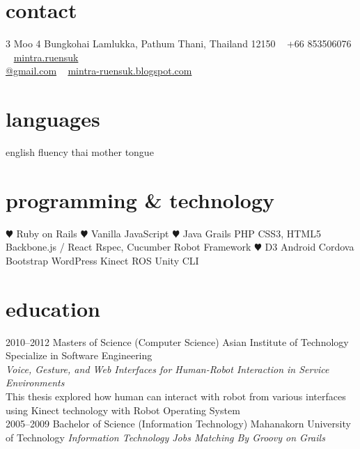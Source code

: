 \documentclass[]{friggeri-cv} %
\begin{document}


\begin{aside} %
\section{contact}
3 Moo 4 Bungkohai
Lamlukka, 
Pathum Thani,
Thailand 12150
~
+66 853506076
~
\href{mailto:mintra.ruensuk@gmail.com}{mintra.ruensuk\\@gmail.com}
~
\href{http://mintra-ruensuk.blogspot.com/}{mintra-ruensuk.blogspot.com}
\section{languages}
english fluency
thai mother tongue
\section{programming \& technology}
{\color{red} $\varheartsuit$} Ruby on Rails
{\color{red} $\varheartsuit$} Vanilla JavaScript
{\color{red} $\varheartsuit$} Java
Grails
PHP
CSS3, HTML5
Backbone.js / React
Rspec, Cucumber
Robot Framework
{\color{red} $\varheartsuit$} D3
Android
Cordova
Bootstrap
WordPress
Kinect
ROS
Unity
CLI
\end{aside}


\section{education}

\begin{entrylist}
\entry
{2010--2012}
{Masters {\normalfont of Science (Computer Science) }}
{Asian Institute of Technology}
{Specialize in Software Engineering\\ \emph{Voice, Gesture, and Web Interfaces for Human-Robot Interaction in Service Environments} \\ This thesis explored how human can interact with robot from various interfaces using Kinect technology with Robot Operating System}\\
\entry
{2005--2009}
{Bachelor {\normalfont of Science (Information Technology)}}
{Mahanakorn University of Technology}
{ \emph{Information Technology Jobs Matching By Groovy on Grails} }\\
\end{entrylist}
\end{document}
